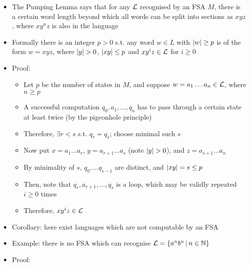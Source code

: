 \begin{itemize}
	
	\item The Pumping Lemma says that for any $ \mathcal{L} $ recognised by an FSA $ M $, there is a certain word length beyond which all words can be split into sections as $ xyz$, where $ x y^n z $ is also in the language
	
	\item Formally there is an integer $ p > 0 $ s.t. any word $ w \in L $ with $ \abs{w} \ge p $ is of the form $ w = xyz $, where $ \abs{y} > 0 $, $ \abs{xy} \le p $ and $ x y^i z \in \mathcal{L} $ for $ i \ge 0 $
	
	\item Proof:
	
	\begin{itemize}
		
		\item Let $ p $ be the number of states in $ M $, and suppose $ w = a_1 \dots a_n \in \mathcal{L} $, where $ n \ge p $
		
		\item A successful computation $ q_0, a_1, \dots, q_n $ has to pass through a certain state at least twice (by the pigeonhole principle)
		
		\item Therefore, $ \exists r < s $ s.t. $ q_r = q_s $; choose minimal such $ s $
		
		\item Now put $ x = a_1 \dots a_r $, $ y = a_{r+1} \dots a_s $ (note $ \abs{y} > 0$), and $ z = a_{s+1} \dots a_n $
		
		\item By minimality of $ s $, $ q_0, \dots q_{s-1} $ are distinct, and $ \abs{xy} = s \le p $
		
		\item Then, note that $ q_r, a_{r+1}, \dots, q_{s} $ is a loop, which may be validly repeated $ i \ge 0 $ times
		
		\item Therefore, $ x y^i z \in \mathcal{L} $
		
	\end{itemize}

	\item Corollary: here exist languages which are not computable by an FSA
	
	\item Example: there is no FSA which can recognise $ \mathcal{L} = \left\lbrace a^n b^n \, | \, n \in \mathbb{N} \right\rbrace $
	
	\item Proof:
	

\end{itemize}
